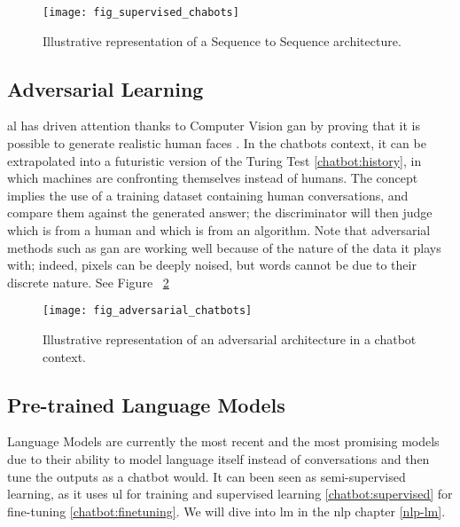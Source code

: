 \begin{figure}[H]
    \centering
    \texttt{[image: fig\_supervised\_chabots]}
    \caption{Illustrative representation of a Sequence to Sequence architecture.}
    \label{fig:fig_supervised_chabots}
\end{figure}

\subsection{Adversarial Learning}
\label{chatbot:adversarial}
\gls{al} has driven attention thanks to Computer Vision \gls{gan} \autocite{paper:Karras2019stylegan2} by proving that it is possible to generate realistic human faces \autocite{website:person_does_not_exist}. In the chatbots context, it can be extrapolated into a futuristic version of the Turing Test \ref{chatbot:history}, in which machines are confronting themselves instead of humans. The concept implies the use of a training dataset containing human conversations, and compare them against the generated answer; the discriminator will then judge which is from a human and which is from an algorithm. Note that adversarial methods such as \gls{gan} are working well because of the nature of the data it plays with; indeed, pixels can be deeply noised, but words cannot be due to their discrete nature. See Figure ~\ref{fig:fig_adversarial_chatbots} 

\begin{figure}[H]
    \centering
    \texttt{[image: fig\_adversarial\_chatbots]}
    \caption{Illustrative representation of an adversarial architecture in a chatbot context.}
    \label{fig:fig_adversarial_chatbots}
\end{figure}

\subsection{Pre-trained Language Models}
Language Models are currently the most recent and the most promising models due to their ability to model language itself instead of conversations and then tune the outputs as a chatbot would. It can been seen as semi-supervised learning, as it uses \gls{ul} for training and supervised learning \ref{chatbot:supervised} for fine-tuning \ref{chatbot:finetuning}. We will dive into \gls{lm} in the \gls{nlp} chapter \ref{nlp-lm}.


